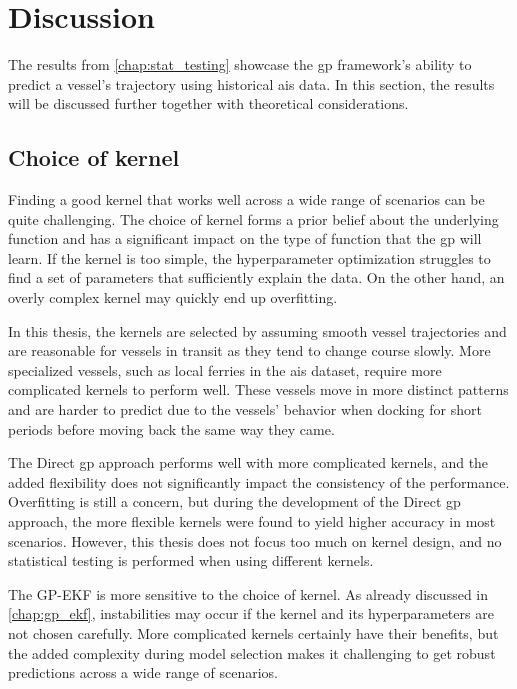 \chapter{Discussion}\label{chap:discussion}

The results from \cref{chap:stat_testing} showcase the \acrshort{gp} framework's ability to predict a vessel's trajectory using historical \acrshort{ais} data. In this section, the results will be discussed further together with theoretical considerations.

\section{Choice of kernel}
Finding a good kernel that works well across a wide range of scenarios can be quite challenging. The choice of kernel forms a prior belief about the underlying function and has a significant impact on the type of function that the \acrshort{gp} will learn. If the kernel is too simple, the hyperparameter optimization struggles to find a set of parameters that sufficiently explain the data. On the other hand, an overly complex kernel may quickly end up overfitting.

In this thesis, the kernels are selected by assuming smooth vessel trajectories and are reasonable for vessels in transit as they tend to change course slowly. More specialized vessels, such as local ferries in the \acrshort{ais} dataset, require more complicated kernels to perform well. These vessels move in more distinct patterns and are harder to predict due to the vessels' behavior when docking for short periods before moving back the same way they came. 

The Direct \acrshort{gp} approach performs well with more complicated kernels, and the added flexibility does not significantly impact the consistency of the performance. Overfitting is still a concern, but during the development of the Direct \acrshort{gp} approach, the more flexible kernels were found to yield higher accuracy in most scenarios. However, this thesis does not focus too much on kernel design, and no statistical testing is performed when using different kernels.

The GP-EKF is more sensitive to the choice of kernel. As already discussed in \cref{chap:gp_ekf}, instabilities may occur if the kernel and its hyperparameters are not chosen carefully. More complicated kernels certainly have their benefits, but the added complexity during model selection makes it challenging to get robust predictions across a wide range of scenarios.

